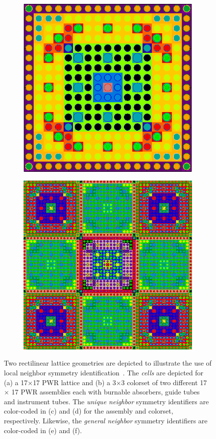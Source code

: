 \begin{figure}
\begin{subfigure}{.5\textwidth}
  \includegraphics[width=.7\linewidth]{figures/workflow/opencg/neighbor-cells-xy-24-16-assm}
  \caption{}
  \label{fig:assm-neighbors}
\end{subfigure}
\begin{subfigure}{.5\textwidth}
  \centering
  \includegraphics[width=.7\linewidth]{figures/workflow/opencg/neighbor-cells-xy-colorset}
  \caption{}
  \label{fig:colorset-neighbors}
\end{subfigure}
\caption{Two rectilinear lattice geometries are depicted to illustrate the use of local neighbor symmetry identification~\cite{boyd2015opencg}. The \textit{cells} are depicted for (a) a 17$\times$17 PWR lattice and (b) a 3$\times$3 colorset of two different 17 $\times$ 17 PWR assemblies each with burnable absorbers, guide tubes and instrument tubes. The \textit{unique neighbor} symmetry identifiers are color-coded in (c) and (d) for the assembly and colorset, respectively. Likewise, the \textit{general neighbor} symmetry identifiers are color-coded in (e) and (f).}
\label{fig:neighbor-cells}
\end{figure}

